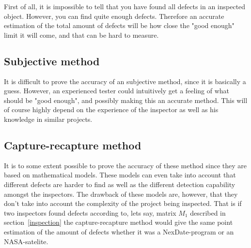 First of all, it is impossible to tell that you have found all defects in an inspected object. However, you can find quite enough defects. 
Therefore an accurate estimation of the total amount of defects will be how close the "good enough" limit it will come, and that can be hard to measure.

\subsection{Subjective method}
It is difficult to prove the accuracy of an subjective method, since it is basically a guess. However, an experienced tester could intuitively get a feeling of what should be "good enough", and possibly making this an accurate method. 
This will of course highly depend on the experience of the inspector as well as his knowledge in similar projects.

\subsection{Capture-recapture method}
It is to some extent possible to prove the accuracy of these method since they are based on mathematical models. These models can even take into account that different defects are harder to find as well as the different detection capability amongst the inspectors. The drawback of these models are, however, that they don't take into account the complexity of the project being inspected. That is if two inspectors found defects according to, lets say, matrix $M_{1}$ described in section~\ref{inspection} the capture-recapture method would give the same point estimation of the amount of defects whether it was a NexDate-program or an NASA-satelite.
